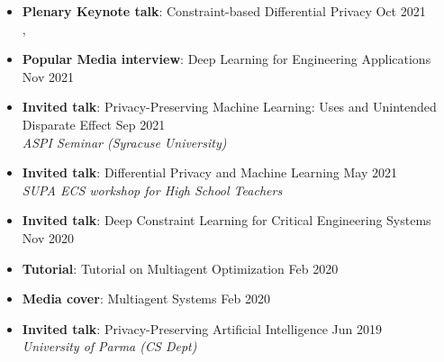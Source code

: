 \begin{itemize}
  \item \textbf{Plenary Keynote talk}: Constraint-based Differential Privacy \hfill Oct 2021\\
  , 
  
  \item {\bf Popular Media interview}: {Deep Learning for Engineering Applications} \hfill {Nov 2021}\\ 

  \item \textbf{Invited talk}: Privacy-Preserving Machine Learning: Uses and Unintended Disparate Effect \hfill Sep 2021\\
  {\em ASPI Seminar (Syracuse University)} 
  
  \item \textbf{Invited talk}: Differential Privacy and Machine Learning \hfill May 2021\\
  {\em SUPA ECS workshop for High School Teachers}
  

  \item {\bf Invited talk}: Deep Constraint Learning for Critical Engineering Systems \hfill {Nov 2020}\\
  
  \item {\bf Tutorial}: {Tutorial on Multiagent Optimization} \hfill {Feb 2020}\\ 
  
  \item {\bf Media cover}: {Multiagent Systems} \hfill{Feb 2020}\\

  \item {\bf Invited talk}:  Privacy-Preserving Artificial Intelligence \hfill {Jun 2019}\\
  {\em University of Parma (CS Dept)} 


\end{itemize}
